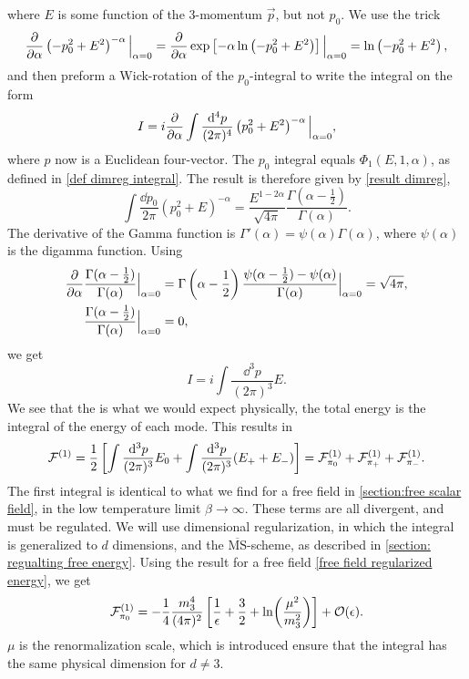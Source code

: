 where $E$ is some function of the 3-momentum $\vec p$, but not $p_0$.
We use the trick
\begin{equation}
    \pdv{\alpha} \left(-p_0^2 + E^2\right)^{-\alpha} \Big|_{\alpha=0}
    = \pdv{\alpha} \exp\left[ -\alpha \ln\left(- p_0^2 + E^2\right)  \right] \Big|_{\alpha=0}
    = \ln\left(- p_0^2 + E^2\right),
\end{equation}
and then preform a Wick-rotation of the $p_0$-integral to write the integral on the form
\begin{equation}
    I = i \pdv{\alpha} \int \frac{\dd^4 p}{(2 \pi)^4} \left(p_0^2 + E^2\right)^{-\alpha} \Big|_{\alpha=0},
\end{equation}
where $p$ now is a Euclidean four-vector.
The $p_0$ integral equals $\Phi_1(E, 1, \alpha)$, as defined in \autoref{def dimreg integral}. 
The result is therefore given by \autoref{result dimreg},
\begin{equation}
    \int \frac{\dd p_0}{2 \pi} (p_0^2 + E)^{-\alpha} 
    = \frac{E^{1-2\alpha}}{\sqrt{4 \pi}} \frac{\Gamma(\alpha-\frac{1}{2})}{\Gamma(\alpha)}.
\end{equation}
The derivative of the Gamma function is $\Gamma'(\alpha) = \psi(\alpha)\Gamma(\alpha)$, where $\psi(\alpha)$ is the digamma function.
Using
\begin{align}
    \diffp{}{\alpha} & \frac{\Gamma(\alpha - \frac{1}{2}) }{\Gamma(\alpha)} \Big|_{\alpha=0}
    = \Gamma\left(\alpha - \frac{1}{2}\right) \frac{\psi(\alpha - \frac{1}{2}) - \psi(\alpha)}{\Gamma(\alpha)} \Big|_{\alpha=0}
    = \sqrt{4 \pi}, \\
    & \frac{\Gamma(\alpha - \frac{1}{2}) }{\Gamma(\alpha)}\Big|_{\alpha=0} = 0,
\end{align}
we get
\begin{equation}
    I = i \int \frac{\dd^3 p}{(2 \pi)^3} E.
\end{equation}
We see that the is what we would expect physically, the total energy is the integral of the energy of each mode.
This results in 
\begin{equation}
    \mathcal{F}^{(1)} = 
    \frac{1}{2} 
    \left[\int \frac{\dd^3 p}{(2\pi)^3} E_0 + \int  \frac{\dd^3 p}{(2\pi)^3} (E_+ + E_-)\right]
    = \mathcal{F}^{(1)}_{\pi_0} +\mathcal{F}^{(1)}_{\pi_+} + \mathcal{F}^{(1)}_{\pi_-}.
\end{equation}
The first integral is identical to what we find for a free field in \autoref{section:free scalar field}, in the low temperature limit $\beta \rightarrow \infty$.
These terms are all divergent, and must be regulated. 
We will use dimensional regularization, in which the integral is generalized to $d$ dimensions, and the $\overline{\mathrm{MS}}$-scheme, as described in \autoref{section: regualting free energy}.
Using the result for a free field \cref{free field regularized energy}, we get
\begin{equation}
    \mathcal{F}^{(1)}_{\pi_0} 
    = 
    - \frac{1}{4} \frac{m_3^4}{(4\pi)^2} 
    \left[ \frac{1}{\epsilon} + \frac{3}{2} + \ln(\frac{\mu^2}{m_3^2}) \right] + \mathcal{O}(\epsilon).
\end{equation}
$\mu$ is the renormalization scale, which is introduced ensure that the integral has the same physical dimension for $d \neq 3$.

